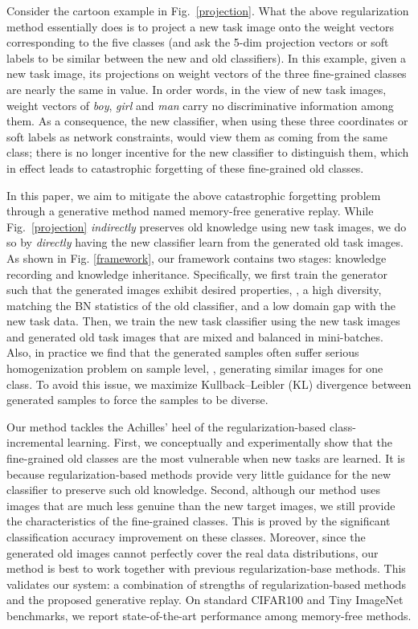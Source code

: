 \documentclass[10pt,twocolumn,letterpaper]{article}
\begin{document}
Consider the cartoon example in Fig.~\ref{projection}. What the above regularization method essentially does is to project a new task image onto the weight vectors corresponding to the five classes (and ask the 5-dim projection vectors or soft labels to be similar between the new and old classifiers). In this example, given a new task image, its projections on weight vectors of the three fine-grained classes are nearly the same in value. 
In order words, in the view of new task images, weight vectors of \emph{boy}, \emph{girl} and \emph{man} carry no discriminative information among them. As a consequence, the new classifier, when using these three coordinates or soft labels as network constraints, would view them as coming from the same class; there is no longer incentive for the new classifier to distinguish them, which in effect leads to catastrophic forgetting of these fine-grained old classes.

In this paper, we aim to mitigate the above catastrophic forgetting problem through a generative method named memory-free generative replay. While Fig.~\ref{projection} \emph{indirectly} preserves old knowledge using new task images, we do so by \emph{directly} having the new classifier learn from the generated old task images. As shown in Fig. \ref{framework}, our framework contains two stages: knowledge recording and knowledge inheritance. Specifically, 
we first train the generator such that the generated images exhibit desired properties, \eg, a high diversity, matching the BN statistics of the old classifier, and a low domain gap with the new task data. Then, we train the new task classifier using the new task images and generated old task images that are mixed and balanced in mini-batches. Also, in practice we find that the generated samples often suffer serious homogenization problem on sample level, \ie, generating similar images for one class. To avoid this issue, we maximize Kullback–Leibler (KL) divergence between generated samples to force the samples to be diverse. 

Our method tackles the Achilles' heel of the regularization-based class-incremental learning. First, we conceptually and experimentally show that the fine-grained old classes are the most vulnerable when new tasks are learned. It is because regularization-based methods provide very little guidance for the new classifier to preserve such old knowledge. Second, although our method uses images that are much less genuine than the new target images, we still provide the characteristics of the fine-grained classes. This is proved by the significant classification accuracy improvement on these classes. 
Moreover, since the generated old images cannot perfectly cover the real data distributions, our method is best to work together with previous regularization-base methods. This validates our system: a combination of strengths of regularization-based methods and the proposed generative replay.
On standard CIFAR100 and Tiny ImageNet benchmarks, we report state-of-the-art performance among memory-free methods. 
\end{document}

